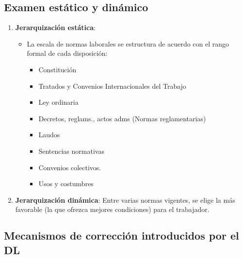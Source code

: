 \documentclass[spanish,12pt,a4paper,titlepage]{report}
\begin{document}
\subsection{Examen estático y dinámico}
\label{sec:examen-estatico-y-dinamico}

\begin{enumerate}
\item \textbf{Jerarquización estática}:
  \begin{itemize}
  \item La escala de normas laborales se estructura de acuerdo con el rango formal de cada disposición:
    \begin{itemize}
    \item Constitución
    \item Tratados y Convenios Internacionales del Trabajo 
    \item Ley ordinaria
    \item Decretos, reglams., actos adms (Normas reglamentarias)
    \item Laudos
    \item Sentencias normativas
    \item Convenios colectivos.
    \item Usos y costumbres
    \end{itemize}
  \end{itemize}
\item \textbf{Jerarquización dinámica}: Entre varias normas vigentes, se elige la más favorable (la que ofrezca mejores condiciones) para el trabajador.
\end{enumerate}

\subsection{Mecanismos de corrección introducidos por el DL}
\label{sec:mecanismos-de-correccion-introducidos-por-el-DL}
\end{document}
